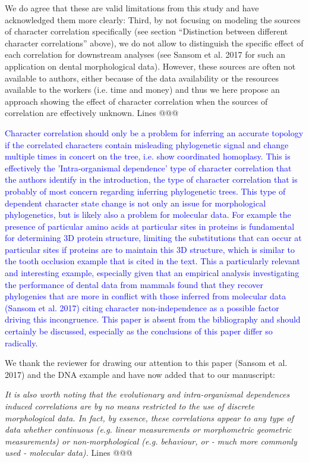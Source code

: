 \documentclass[12pt,letterpaper]{article}
\begin{document}
We do agree that these are valid limitations from this study and have acknowledged them more clearly:
Third, by not focusing on modeling the sources of character correlation specifically (see section “Distinction between different character correlations” above), we do not allow to distinguish the specific effect of each correlation for downstream analyses (see Sansom et al. 2017 for such an application on dental morphological data). However, these sources are often not available to authors, either because of the data availability or the resources available to the workers (i.e. time and money) and thus we here propose an approach showing the effect of character correlation when the sources of correlation are effectively unknown. Lines @@@



\textcolor{blue}{Character correlation should only be a problem for inferring an accurate topology if the correlated characters contain misleading phylogenetic signal and change multiple times in concert on the tree, i.e. show coordinated homoplasy.  This is effectively the 'Intra-organismal dependence' type of character correlation that the authors identify in the introduction, the type of character correlation that is probably of most concern regarding inferring phylogenetic trees. This type of dependent character state change is not only an issue for morphological phylogenetics, but is likely also a problem for molecular data. For example the presence of particular amino acids at particular sites in proteins is fundamental for determining 3D protein structure, limiting the substitutions that can occur at particular sites if proteins are to maintain this 3D structure, which is similar to the tooth occlusion example that is cited in the text. This a particularly relevant and interesting example, especially given that an empirical analysis investigating the performance of dental data from mammals found that they recover phylogenies that are more in conflict with those inferred from molecular data (Sansom et al. 2017) citing character non-independence as a possible factor driving this incongruence. This paper is absent from the bibliography and should certainly be discussed, especially as the conclusions of this paper differ so radically.}

We thank the reviewer for drawing our attention to this paper (Sansom et al. 2017) and the DNA example and have now added that to our manuscript:

\textit{It is also worth noting that the evolutionary and intra-organismal dependences induced correlations are by no means restricted to the use of discrete morphological data. In fact, by essence, these correlations appear to any type of data whether continuous (e.g. linear measurements or morphometric geometric measurements) or non-morphological (e.g. behaviour, or - much more commonly used - molecular data).} Lines @@@
\end{document}
